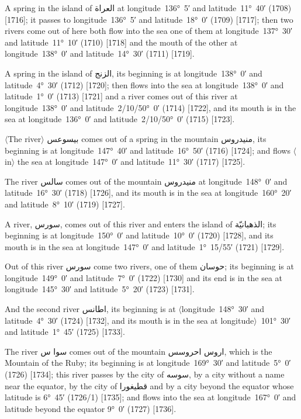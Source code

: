 \documentclass[11pt]{article}
\newcommand{\Pg}[1]{\marginpar{\footnotesize #1}}
\newcommand{\Ang}[1]{\ensuremath{#1}}
\begin{document}
A spring in the island of \textarabic{العراة} at longitude~136°~5′ and latitude~11°~40′ (1708) [1716]; it passes to longitude~136°~5′ and latitude~18°~0′ (1709) [1717]; then two rivers come out of here both flow into the sea one of them at longitude~137°~30′ and latitude~11°~10′ (1710) [1718] and the mouth of the other at longitude~138°~0′ and latitude~14°~30′ (1711) [1719].

A spring in the island of \textarabic{الزنج}, its beginning is at longitude~138°~0′ and latitude~4°~30′ (1712) [1720]; then flows into the sea at longitude~138°~0′ and latitude~1°~0′ (1713) [1721] and a river comes out of this river at longitude~138°~0′ and latitude~2/10/50°~0′ (1714) [1722], and its mouth is in the sea at longitude~136°~0′ and latitude~2/10/50°~0′ (1715) [1723].

\Ang{\langle}The river\Ang{\rangle} \textarabic{بيسوعس} comes out of a spring in the mountain \textarabic{منيدروس}, its beginning is at longitude~147°~40′ and latitude~16°~50′ (1716) [1724]; and flows \Ang{\langle}in\Ang{\rangle} the sea at longitude~147°~0′ and latitude~11°~30′ (1717) [1725].

\Pg{p. 114}The river \textarabic{سالس} comes out of the mountain \textarabic{منيدروس} at longitude~148°~0′ and latitude~16°~30′ (1718) [1726], and its mouth is in the sea at longitude~160°~20′ and latitude~8°~10′ (1719) [1727].

A river, \textarabic{سورس}, comes out of this river and enters the island of \textarabic{الذهبانيّة}; its beginning is at longitude~150°~0′ and latitude~10°~0′ (1720) [1728], and its mouth is in the sea at longitude~147°~0′ and latitude~1°~15/55′ (1721) [1729].

Out of this river \textarabic{سورس} come two rivers, one of them \textarabic{حوسان}; its beginning is at longitude~149°~0′ and latitude~7°~0′ (1722) [1730] and its end is in the sea at longitude~145°~30′ and latitude~5°~20′ (1723) [1731].

And the second river \textarabic{اطانس}, its beginning is at \Ang{\langle}longitude~148°~30′ and latitude~4°~30′ (1724) [1732], and its mouth is in the sea at longitude\Ang{\rangle}~101°~30′ and latitude~1°~45′ (1725) [1733].

The river \textarabic{سوا س} comes out of the mountain \textarabic{اروس احروسس}, which is the Mountain of the Ruby; its beginning is at longitude~169°~30′ and latitude~5°~0′ (1726) [1734]; this river passes by the city of \textarabic{سوسه}, by a city without a name near the equator, by the city of \textarabic{قطيغورا} and by a city beyond the equator whose latitude is 6°~45′ (1726/1) [1735]; and flows into the sea at longitude~167°~0′ and latitude beyond the equator 9°~0′ (1727) [1736].
\end{document}
